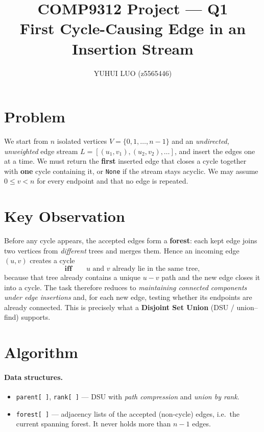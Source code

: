 \documentclass[11pt]{article}
\title{\vspace{-1.4em}\textbf{COMP9312 Project --- Q1}\\[0.2em]
\large First Cycle-Causing Edge in an Insertion Stream}
\author{YUHUI LUO \quad (z5565446)}
\date{}
\begin{document}
\maketitle
\vspace{-2.2em}

\section{Problem}
We start from $n$ isolated vertices $V=\{0,1,\dots,n-1\}$ and an
\emph{undirected, unweighted} edge stream $L=[(u_1,v_1),(u_2,v_2),\dots]$, and
insert the edges one at a time. We must return the \textbf{first} inserted edge
that closes a cycle together with \textbf{one} cycle containing it, or
\texttt{None} if the stream stays acyclic. We may assume $0\le v<n$ for every
endpoint and that no edge is repeated.

\section{Key Observation}
Before any cycle appears, the accepted edges form a \textbf{forest}: each kept
edge joins two vertices from \emph{different} trees and merges them. Hence an
incoming edge $(u,v)$ creates a cycle
\[
  \textbf{iff}\qquad u \text{ and } v \text{ already lie in the same tree},
\]
because that tree already contains a unique $u\!-\!v$ path and the new edge
closes it into a cycle. The task therefore reduces to \emph{maintaining
connected components under edge insertions} and, for each new edge, testing
whether its endpoints are already connected. This is precisely what a
\textbf{Disjoint Set Union} (DSU / union--find) supports.

\section{Algorithm}

\paragraph{Data structures.}
\begin{itemize}[leftmargin=1.4em, itemsep=2pt]
  \item \texttt{parent[\,]}, \texttt{rank[\,]} --- DSU with \emph{path
  compression} and \emph{union by rank}.
  \item \texttt{forest[\,]} --- adjacency lists of the accepted (non-cycle)
  edges, i.e.\ the current spanning forest. It never holds more than $n-1$ edges.
\end{itemize}
\end{document}
